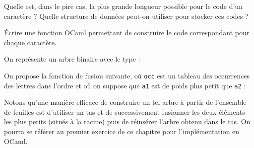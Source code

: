Quelle est, dans le pire cas, la plus grande longueur possible pour le code d'un caractère ? Quelle structure de données peut-on utiliser pour stocker ces codes ?
\medskip

Écrire une fonction OCaml permettant de construire le code correspondant pour chaque caractère.

\Corrige

\Q
On représente un arbre binaire avec le type :



On propose la fonction de fusion suivante, où \texttt{occ} est un tableau des occurrences des lettres dans l'ordre et où on suppose que \texttt{a1} est de poids plus petit que \texttt{a2} :



\Q
Notons qu'une manière efficace de construire un tel arbre à partir de l'ensemble de feuilles est d'utiliser un tas et de successivement fusionner les deux éléments les plus petits (situés à la racine) puis de réinsérer l'arbre obtenu dans le tas. On pourra se référer au premier exercice de ce chapitre pour l'implémentation en OCaml.
\bigskip

